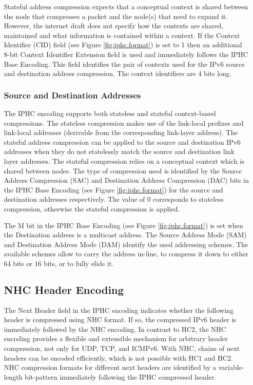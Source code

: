 \documentclass[12pt, titlepage, a4paper]{report}
\begin{document}
Stateful address compression expects that a conceptual context is shared between the node that compresses a packet and the node(s) that need to expand it.  However, the internet draft \cite{draft-hc-06} does not specify how the contexts are shared, maintained and what information is contained within a context. If the Context Identifier (CID) field (see Figure \ref{fig:iphc.format}) is set to 1 then an additional 8-bit Context Identifier Extension field is used and immediately follows the IPHC Base Encoding. This field identifies the pair of contexts used for the IPv6 source and destination address compression. The context identifiers are 4 bits long.

\subsubsection{Source and Destination Addresses}
The IPHC encoding supports both stateless and stateful context-based compressions. The stateless compression makes use of the link-local prefixes and link-local addresses (derivable from the corresponding link-layer address). The stateful address compression can be applied to the source and destination IPv6 addresses when they do not statelessly match the source and destination link layer addresses. The stateful compression relies on a conceptual context which is shared between nodes. The type of compression used is identified by the Source Address Compression (SAC) and Destination Address Compression (DAC) bits in the IPHC Base Encoding (see Figure \ref{fig:iphc.format}) for the source and destination addresses respectively. The value of 0 corresponds to stateless compression, otherwise the stateful compression is applied.

The M bit in the IPHC Base Encoding (see Figure \ref{fig:iphc.format}) is set when the Destination address is a multicast address. The Source Address Mode (SAM) and Destination Address Mode (DAM) identify the used addressing schemes. The available schemes allow to carry the address in-line, to compress it down to either 64 bits or 16 bits, or to fully elide it.

\subsection{NHC Header Encoding}\label{sec:nhc}
The Next Header field in the IPHC encoding indicates whether the following header is compressed using NHC format.  If so, the compressed IPv6 header is immediately followed by the NHC encoding. In contrast to HC2, the NHC encoding provides a flexible and extensible mechanism for arbitrary header compression, not only for UDP, TCP, and ICMPv6. With NHC, chains of next headers can be encoded efficiently, which is not possible with HC1 and HC2. NHC compression formats for different next headers are identified by a variable-length bit-pattern immediately following the IPHC compressed header.
\end{document}

